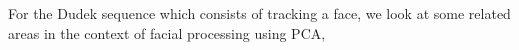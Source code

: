 
For the Dudek sequence which consists of tracking a face, we look at some related areas in the context of facial processing using PCA, 

